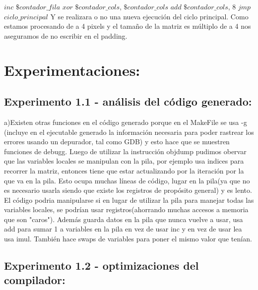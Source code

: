 \documentclass[a4paper]{article}
\begin{document}
$inc$ $\$contador\_fila$\newline
$xor$ $\$contador\_cols$, $\$contador\_cols$\newline
$add$ $\$contador\_cols$, 8\newline
$jmp$ $ciclo\_principal$ \newline
Y se realizara o no una nueva ejecución del ciclo principal. Como estamos procesando de a 4 pixels y el tamaño de la matriz es múltiplo de a 4 nos aseguramos de no escribir en el padding.\newpage


\section{Experimentaciones:}



\subsection{Experimento 1.1 - análisis del código generado:}
a)Existen otras funciones en el código generado porque en el MakeFile se usa -g (incluye en el ejecutable generado la información necesaria para poder rastrear los errores usando un depurador, tal como GDB) y esto hace que se muestren funciones de debugg.\newline
Luego de utilizar la instrucción objdump pudimos obervar que las variables locales se manipulan con la pila, por ejemplo usa indices para recorrer la matriz, entonces tiene que estar actualizando por la iteración por la que va en la pila.\newline
Esto ocupa muchas líneas de código, lugar en la pila(ya que no es necesario usarla siendo que existe los registros de propósito general) y es lento. \newline
El código podria manipularse si en lugar de utilizar la pila para manejar todas las variables locales, se podrían usar registros(ahorrando muchas accesos a memoria que son "caros").\newline
Además guarda datos en la pila que nunca vuelve a usar, usa add para sumar 1 a variables en la pila en vez de usar inc y en vez de usar lea usa imul.
También hace swaps de variables para poner el mismo valor que tenían.
\newline

\subsection{Experimento 1.2 - optimizaciones del compilador:}
\end{document}
